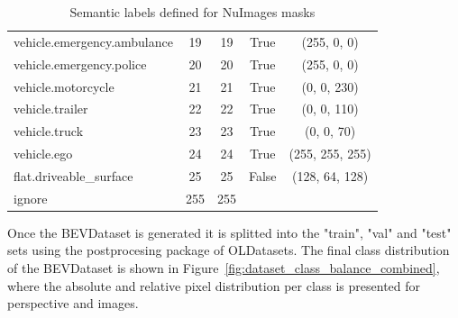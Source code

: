 \begin{table}[!ht]
\begin{tabular}{l c c c c}
        vehicle.emergency.ambulance         & 19 & 19 & True  & (255, 0, 0) \\
        vehicle.emergency.police            & 20 & 20 & True  & (255, 0, 0) \\
        vehicle.motorcycle                  & 21 & 21 & True  & (0, 0, 230) \\
        vehicle.trailer                     & 22 & 22 & True  & (0, 0, 110) \\
        vehicle.truck                       & 23 & 23 & True  & (0, 0, 70) \\
        vehicle.ego                         & 24 & 24 & True  & (255, 255, 255) \\
        flat.driveable\_surface             & 25 & 25 & False & (128, 64, 128) \\
        \midrule
        ignore                              & 255 & 255 &       &        \\
        \bottomrule
    \end{tabular}
    \caption{Semantic labels defined for NuImages masks}
    \label{tab:semantic_labels}
\end{table}

Once the BEVDataset is generated it is splitted into the "train", "val" and "test" sets using the postprocesing package of OLDatasets. The final class distribution of the BEVDataset is shown in Figure~\ref{fig:dataset_class_balance_combined}, where the absolute and relative pixel distribution per class is presented for perspective and  images. 

